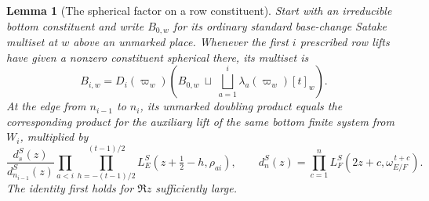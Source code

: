 \documentclass[a4paper,11pt]{article}
\newtheorem{lemma}[proposition]{Lemma}
\theoremstyle{definition}
\theoremstyle{remark}
\numberwithin{equation}{section}
\begin{document}
\begin{lemma}[The spherical factor on a row constituent]
\leavevmode\label{lem:sphericalchain810}
Start with an irreducible bottom constituent and write \(B_{0,w}\)
for its ordinary standard base-change Satake multiset at \(w\)
above an unmarked place. Whenever the first \(i\) prescribed row
lifts have given a nonzero constituent spherical there, its multiset is
\[
 B_{i,w}=D_i(\varpi_w)
       \left(B_{0,w}\ \sqcup\
        \bigsqcup_{a=1}^i \lambda_a(\varpi_w)[t]_w\right).
\]
At the edge from \(n_{i-1}\) to \(n_i\), its unmarked doubling
product equals the corresponding product for the auxiliary
lift of the same bottom finite system from \(W_i\), multiplied by
\[
 \frac{d_s^S(z)}{d_{n_{i-1}}^S(z)}
 \prod_{a<i}\prod_{h=-(t-1)/2}^{(t-1)/2}
       L_E^S(z+\tfrac12-h,\rho_{ai}),\qquad
 d_n^S(z)=\prod_{c=1}^n L_F^S(2z+c,\omega_{E/F}^{\,t+c}).
\]
The identity first holds for \(\Re z\) sufficiently large.
\end{lemma}
\end{document}
